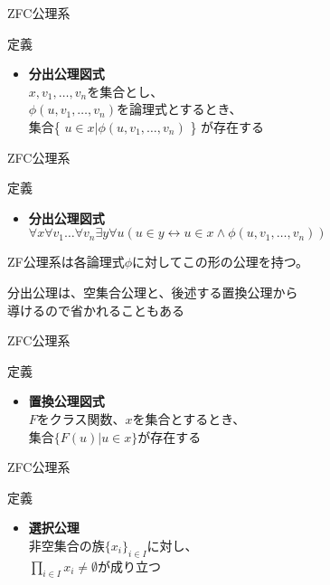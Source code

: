 \documentclass[17pt,aspectratio=169,xcolor=dvipsnames,table,dvipdfmx]{beamer}
\theoremstyle{definition}
\begin{document}
\begin{frame}{ZFC公理系}
    \begin{block}{定義}
        \begin{itemize}
            \item \textbf{分出公理図式} \\
                  $x, v_1, \dots, v_n$を集合とし、\\
                  $\phi (u, v_1, \dots, v_n)$を論理式とするとき、\\
                  集合\{ $u \in x | \phi(u, v_1, \dots, v_n)$ \} が存在する
        \end{itemize}
    \end{block}

\end{frame}

\begin{frame}{ZFC公理系}
    \begin{block}{定義}
        \begin{itemize}
            \item \textbf{分出公理図式} \\
                  $\forall x \forall v_1 \dots \forall v_n \exists y \forall u (u \in y \leftrightarrow u \in x \land \phi(u, v_1, \dots, v_n))$
        \end{itemize}
        ZF公理系は各論理式$\phi$に対してこの形の公理を持つ。
    \end{block}

    分出公理は、空集合公理と、後述する置換公理から\\
    導けるので省かれることもある
\end{frame}

\begin{frame}{ZFC公理系}
    \begin{block}{定義}
        \begin{itemize}
            \item \textbf{置換公理図式} \\
                  $F$をクラス関数、$x$を集合とするとき、\\
                  集合$\{ F(u) | u \in x \}$が存在する
        \end{itemize}
    \end{block}
\end{frame}


\begin{frame}{ZFC公理系}
    \begin{block} {定義}
        \begin{itemize}
            \item \textbf{選択公理} \\
                  非空集合の族$\{x_i\}_{i \in I}$に対し、\\
                  $\prod_{i \in I} x_i \neq \emptyset$が成り立つ
        \end{itemize}
    \end{block}
\end{frame}
\end{document}
